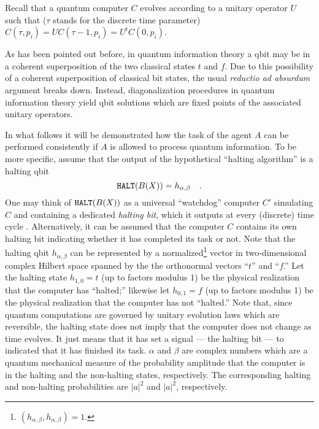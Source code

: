 Recall that a quantum computer $C$ evolves according to a unitary
operator
$U$  such that ($\tau $ stands for the discrete time parameter)
$ C(\tau ,p_i)  =U C(\tau -1, p_i)
=U^t C(0,p_i)$.



As has been pointed out before, in quantum information theory
a qbit may be in a coherent
superposition
of the two classical states $t$ and $f$.
Due to this possibility of a coherent superposition of classical bit
states, the usual {\it reductio ad absurdum} argument breaks down.
Instead, diagonalization procedures in
quantum information theory yield qbit solutions which are fixed points
of the associated unitary operators.


In what follows it will be demonstrated how the task of the agent $A$
can be performed consistently if
$A$ is allowed to process quantum information.
To be more specific, assume that the output of the hypothetical
``halting algorithm'' is a halting qbit
\begin{equation}
{\tt HALT} ( B(X) ) = h_{\alpha , \beta}
\quad .
\end{equation}
One may think of   ${\tt HALT} ( B(X) )$ as a universal ``watchdog''
computer
$C'$
simulating $C$ and containing a dedicated {\em halting bit}, which it
 outputs
at every (discrete) time cycle
\cite{deutsch}.
 Alternatively, it can be
assumed that the computer $C$ contains its own halting bit
indicating whether it has completed its task or not.
Note that the halting qbit
$ h_{\alpha , \beta}
$ can be represented by a normalized\footnote{ $(
h_{\alpha , \beta},
h_{\alpha , \beta})=1$.}
 vector
 in two-dimensional complex
Hilbert space spanned by the
 the orthonormal vectors
``$t $''
and
``$f $.''
Let the halting state $h_{ 1,0} =
t
$ (up to factors modulus  1) be the physical realization that the
computer has
``halted;''
likewise let
$h_{ 0,1} = f$ (up to factors modulus  1)
be the physical realization that the computer has not
``halted.''
Note that, since quantum computations are governed by unitary evolution
laws which are reversible, the halting state does not imply that the
computer does not change as time evolves. It just means that it has set
a signal --- the halting bit --- to indicated that it has finished its
task.
$\alpha $ and $\beta$ are complex numbers which are a quantum mechanical
measure
of the probability amplitude that the computer is in the halting and the
non-halting states, respectively.
The corresponding halting and non-halting probabilities are $\vert
a\vert^2$ and $\vert a\vert^2$, respectively.

